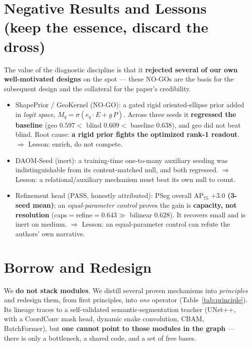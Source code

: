 \documentclass[11pt,a4paper]{article}
\newcommand{\good}[1]{\textcolor{good}{#1}}
\newcommand{\bad}[1]{\textcolor{bad}{#1}}
\begin{document}
\section{Negative Results and Lessons (keep the essence, discard the dross)}
The value of the diagnostic discipline is that it \textbf{rejected several of our own well-motivated
designs} on the spot --- these NO-GOs are the basis for the subsequent design and the collateral for
the paper's credibility.

\begin{itemize}[leftmargin=1.2em,itemsep=2pt]
\item \bad{ShapePrior / GeoKernel (NO-GO)}: a gated rigid oriented-ellipse prior added in
\emph{logit space}, $M_q=\sigma(e_q\!\cdot\!E+g\,P)$. Across three seeds it \textbf{regressed the
baseline} (geo $0.597 <$ blind $0.609 <$ baseline $0.638$), and geo did not beat blind. Root cause:
\textbf{a rigid prior fights the optimized rank-1 readout}. $\Rightarrow$ \good{Lesson: enrich, do not
compete.}
\item \bad{DAOM-Seed (inert)}: a training-time one-to-many auxiliary seeding was indistinguishable from
its content-matched null, and both regressed. $\Rightarrow$ \good{Lesson: a relational/auxiliary
mechanism must beat its own null to count.}
\item \good{Refinement head (PASS, honestly attributed)}: PSeg overall AP$_{75}$ \textbf{$+3.0$
(3-seed mean)}; an \emph{equal-parameter control} proves the gain is \textbf{capacity, not resolution}
(caps$=$refine$=0.643 \gg$ bilinear $0.628$). It recovers small and is inert on medium. $\Rightarrow$
\good{Lesson: an equal-parameter control can refute the authors' own narrative.}
\end{itemize}

\section{Borrow and Redesign}
We \textbf{do not stack modules}. We distill several proven mechanisms into \emph{principles} and
redesign them, from first principles, into \emph{one} operator (Table~\ref{tab:principle}). Its lineage
traces to a self-validated semantic-segmentation teacher (UNet++, with a CoordConv mask head, dynamic
snake convolution, CBAM, BatchFormer), but \textbf{one cannot point to those modules in the graph} ---
there is only a bottleneck, a shared code, and a set of free bases.
\end{document}
